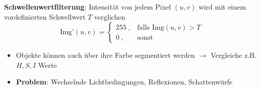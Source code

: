 \textbf{Schwellenwertfilterung}: Intensität von jedem Pixel $(u,v)$ wird mit einem vordefinierten Schwellwert $T$ verglichen
$$\text{Img'}(u,v)=\begin{cases}
	255\;, & \text{falls Img}(u,v)>T\\
	0\;, & \text{sonst}
\end{cases}$$
\begin{itemize}
	\item Objekte können auch über ihre Farbe segmentiert werden $\rightarrow$ Vergleiche z.B. $H,S,I$ Werte
	\item \textbf{Problem}: Wechselnde Lichtbedingungen, Reflexionen, Schattenwürfe
\end{itemize}